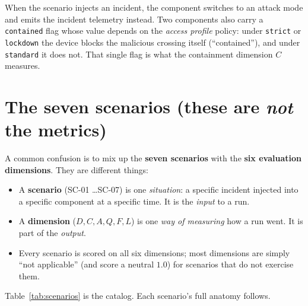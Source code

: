 \documentclass[11pt]{article}
\newcommand{\code}[1]{\texttt{\small #1}}
\begin{document}
When the scenario injects an incident, the component switches to an attack mode
and emits the incident telemetry instead. Two components also carry a
\code{contained} flag whose value depends on the \emph{access profile} policy:
under \code{strict} or \code{lockdown} the device blocks the malicious crossing
itself (``contained''), and under \code{standard} it does not. That single flag
is what the containment dimension $C$ measures.

\section{The seven scenarios (these are \emph{not} the metrics)}
\label{sec:scenarios}

A common confusion is to mix up the \textbf{seven scenarios} with the
\textbf{six evaluation dimensions}. They are different things:

\begin{itemize}[leftmargin=1.4em]
  \item A \textbf{scenario} (SC-01 \ldots SC-07) is one \emph{situation}: a
        specific incident injected into a specific component at a specific time.
        It is the \emph{input} to a run.
  \item A \textbf{dimension} ($D, C, A, Q, F, L$) is one \emph{way of measuring}
        how a run went. It is part of the \emph{output}.
  \item Every scenario is scored on all six dimensions; most dimensions are
        simply ``not applicable'' (and score a neutral $1.0$) for scenarios that
        do not exercise them.
\end{itemize}

Table~\ref{tab:scenarios} is the catalog. Each scenario's full anatomy follows.
\end{document}
